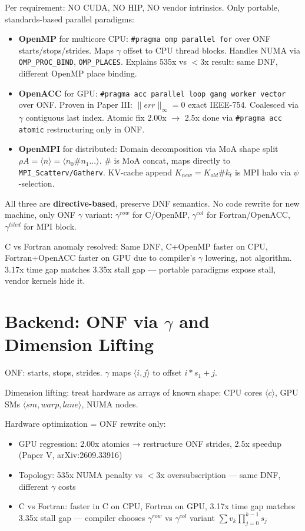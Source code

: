 \documentclass[11pt,a4paper]{article}
\begin{document}
Per requirement: NO CUDA, NO HIP, NO vendor intrinsics. Only portable, standards-based parallel paradigms:

\begin{itemize}
\item \textbf{OpenMP} for multicore CPU: \texttt{\#pragma omp parallel for} over ONF starts/stops/strides. Maps $\gamma$ offset to CPU thread blocks. Handles NUMA via \texttt{OMP\_PROC\_BIND}, \texttt{OMP\_PLACES}. Explains 535x vs $<$3x result: same DNF, different OpenMP place binding.
\item \textbf{OpenACC} for GPU: \texttt{\#pragma acc parallel loop gang worker vector} over ONF. Proven in Paper III: $\|err\|_\infty=0$ exact IEEE-754. Coalesced via $\gamma$ contiguous last index. Atomic fix 2.00x $\rightarrow$ 2.5x done via \texttt{\#pragma acc atomic} restructuring only in ONF.
\item \textbf{OpenMPI} for distributed: Domain decomposition via MoA shape split $\rho A = \langle n \rangle = \langle n_0 \# n_1 ... \rangle$. $\#$ is MoA concat, maps directly to \texttt{MPI\_Scatterv/Gatherv}. KV-cache append $K_{new}=K_{old}\#k_t$ is MPI halo via $\psi$-selection.
\end{itemize}

All three are \textbf{directive-based}, preserve DNF semantics. No code rewrite for new machine, only ONF $\gamma$ variant: $\gamma^{row}$ for C/OpenMP, $\gamma^{col}$ for Fortran/OpenACC, $\gamma^{tiled}$ for MPI block.

C vs Fortran anomaly resolved: Same DNF, C+OpenMP faster on CPU, Fortran+OpenACC faster on GPU due to compiler's $\gamma$ lowering, not algorithm. 3.17x time gap matches 3.35x stall gap — portable paradigms expose stall, vendor kernels hide it.

\section{Backend: ONF via $\gamma$ and Dimension Lifting}

ONF: starts, stops, strides. $\gamma$ maps $\langle i,j\rangle$ to offset $i*s_1+j$.

Dimension lifting: treat hardware as arrays of known shape: CPU cores $\langle c\rangle$, GPU SMs $\langle sm, warp, lane\rangle$, NUMA nodes.

Hardware optimization = ONF rewrite only:
\begin{itemize}
\item GPU regression: 2.00x atomics → restructure ONF strides, 2.5x speedup (Paper V, arXiv:2609.33916)
\item Topology: 535x NUMA penalty vs $<$3x oversubscription — same DNF, different $\gamma$ costs
\item C vs Fortran: faster in C on CPU, Fortran on GPU, 3.17x time gap matches 3.35x stall gap — compiler chooses $\gamma^{row}$ vs $\gamma^{col}$ variant $\sum v_k\prod_{j=0}^{k-1}s_j$
\end{itemize}
\end{document}
